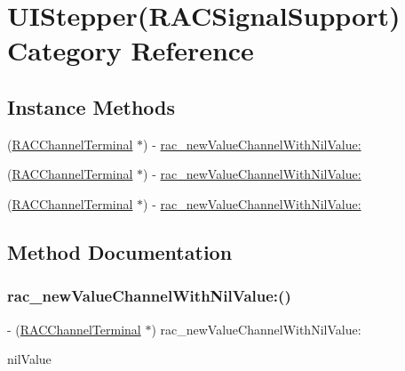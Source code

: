\hypertarget{category_u_i_stepper_07_r_a_c_signal_support_08}{}\section{U\+I\+Stepper(R\+A\+C\+Signal\+Support) Category Reference}
\label{category_u_i_stepper_07_r_a_c_signal_support_08}
\subsection*{Instance Methods}
\begin{DoxyCompactItemize}
\item 
(\mbox{\hyperlink{interface_r_a_c_channel_terminal}{R\+A\+C\+Channel\+Terminal}} $\ast$) -\/ \mbox{\hyperlink{category_u_i_stepper_07_r_a_c_signal_support_08_a1fa058112e8d15cbabc5e408b8e4dd04}{rac\+\_\+new\+Value\+Channel\+With\+Nil\+Value\+:}}
\item 
(\mbox{\hyperlink{interface_r_a_c_channel_terminal}{R\+A\+C\+Channel\+Terminal}} $\ast$) -\/ \mbox{\hyperlink{category_u_i_stepper_07_r_a_c_signal_support_08_a1fa058112e8d15cbabc5e408b8e4dd04}{rac\+\_\+new\+Value\+Channel\+With\+Nil\+Value\+:}}
\item 
(\mbox{\hyperlink{interface_r_a_c_channel_terminal}{R\+A\+C\+Channel\+Terminal}} $\ast$) -\/ \mbox{\hyperlink{category_u_i_stepper_07_r_a_c_signal_support_08_a1fa058112e8d15cbabc5e408b8e4dd04}{rac\+\_\+new\+Value\+Channel\+With\+Nil\+Value\+:}}
\end{DoxyCompactItemize}


\subsection{Method Documentation}
\mbox{\label{category_u_i_stepper_07_r_a_c_signal_support_08_a1fa058112e8d15cbabc5e408b8e4dd04}} 
\subsubsection{\texorpdfstring{rac\+\_\+new\+Value\+Channel\+With\+Nil\+Value\+:()}{rac\_newValueChannelWithNilValue:()}\hspace{0.1cm}{\footnotesize\ttfamily [1/3]}}
{\footnotesize\ttfamily -\/ (\mbox{\hyperlink{interface_r_a_c_channel_terminal}{R\+A\+C\+Channel\+Terminal}} $\ast$) rac\+\_\+new\+Value\+Channel\+With\+Nil\+Value\+: \begin{DoxyParamCaption}\item[{(N\+S\+Number $\ast$)}]{nil\+Value }\end{DoxyParamCaption}}

